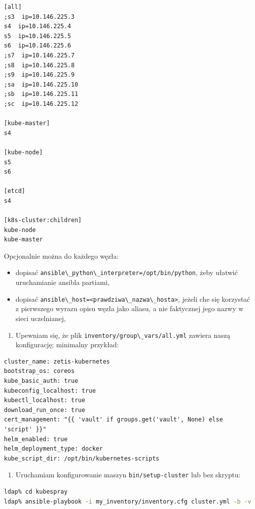 \documentclass[a4paper,12pt,twoside,openany]{report}
\providecommand{\tightlist}{%
  \setlength{\itemsep}{0pt}\setlength{\parskip}{0pt}}
\newcommand{\passthrough}[1]{#1}
\begin{document}
\begin{lstlisting}
[all]
;s3  ip=10.146.225.3
s4  ip=10.146.225.4
s5  ip=10.146.225.5
s6  ip=10.146.225.6
;s7  ip=10.146.225.7
;s8  ip=10.146.225.8
;s9  ip=10.146.225.9
;sa  ip=10.146.225.10
;sb  ip=10.146.225.11
;sc  ip=10.146.225.12

[kube-master]
s4

[kube-node]
s5
s6

[etcd]
s4

[k8s-cluster:children]
kube-node
kube-master
\end{lstlisting}

Opcjonalnie można do każdego węzła:

\begin{itemize}
\tightlist
\item
  dopisać
  \passthrough{\lstinline!ansible\_python\_interpreter=/opt/bin/python!},
  żeby ułatwić uruchamianie ansibla partiami,
\item
  dopisać
  \passthrough{\lstinline!ansible\_host=<prawdziwa\_nazwa\_hosta>!},
  jeżeli che się korzystać z pierwszego wyrazu opisu węzła jako aliasu,
  a nie faktycznej jego nazwy w sieci uczelnianej,
\end{itemize}

\begin{enumerate}
\def\labelenumi{\arabic{enumi}.}
\setcounter{enumi}{6}
\tightlist
\item
  Upewniam się, że plik
  \passthrough{\lstinline!inventory/group\_vars/all.yml!} zawiera naszą
  konfigurację; minimalny przykład:
\end{enumerate}

\begin{lstlisting}
cluster_name: zetis-kubernetes
bootstrap_os: coreos
kube_basic_auth: true
kubeconfig_localhost: true
kubectl_localhost: true
download_run_once: true
cert_management: "{{ 'vault' if groups.get('vault', None) else 'script' }}"
helm_enabled: true
helm_deployment_type: docker
kube_script_dir: /opt/bin/kubernetes-scripts
\end{lstlisting}

\begin{enumerate}
\def\labelenumi{\arabic{enumi}.}
\setcounter{enumi}{7}
\tightlist
\item
  Uruchamiam konfigurowanie maszyn
  \passthrough{\lstinline!bin/setup-cluster!} lub bez skryptu:
\end{enumerate}

\begin{lstlisting}[language=bash]
ldap% cd kubespray
ldap% ansible-playbook -i my_inventory/inventory.cfg cluster.yml -b -v
\end{lstlisting}
\end{document}
